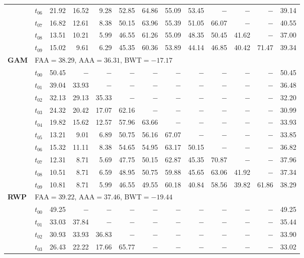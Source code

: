 \begin{table}[ht]
\begin{tabular}{@{}l l r r r r r r r r r r r@{}}
 & $t_{06}$ & 21.92 & 16.52 & 9.28 & 52.85 & 64.86 & 55.09 & 53.45 & $-$ & $-$ & $-$ & 39.14 \\
 & $t_{07}$ & 16.82 & 12.61 & 8.38 & 50.15 & 63.96 & 55.39 & 51.05 & 66.07 & $-$ & $-$ & 40.55 \\
 & $t_{08}$ & 13.51 & 10.21 & 5.99 & 46.55 & 61.26 & 55.09 & 48.35 & 50.45 & 41.62 & $-$ & 37.00 \\
 & $t_{09}$ & 15.02 & 9.61 & 6.29 & 45.35 & 60.36 & 53.89 & 44.14 & 46.85 & 40.42 & 71.47 & 39.34 \\
\midrule
\multirow{11}{*}{\textbf{GAM}} & \multicolumn{12}{l}{\quad\small FAA$=38.29$,\; AAA$=36.31$,\; BWT$=-17.17$} \\
 & $t_{00}$ & 50.45 & $-$ & $-$ & $-$ & $-$ & $-$ & $-$ & $-$ & $-$ & $-$ & 50.45 \\
 & $t_{01}$ & 39.04 & 33.93 & $-$ & $-$ & $-$ & $-$ & $-$ & $-$ & $-$ & $-$ & 36.48 \\
 & $t_{02}$ & 32.13 & 29.13 & 35.33 & $-$ & $-$ & $-$ & $-$ & $-$ & $-$ & $-$ & 32.20 \\
 & $t_{03}$ & 24.32 & 20.42 & 17.07 & 62.16 & $-$ & $-$ & $-$ & $-$ & $-$ & $-$ & 30.99 \\
 & $t_{04}$ & 19.82 & 15.62 & 12.57 & 57.96 & 63.66 & $-$ & $-$ & $-$ & $-$ & $-$ & 33.93 \\
 & $t_{05}$ & 13.21 & 9.01 & 6.89 & 50.75 & 56.16 & 67.07 & $-$ & $-$ & $-$ & $-$ & 33.85 \\
 & $t_{06}$ & 15.32 & 11.11 & 8.38 & 54.65 & 54.95 & 63.17 & 50.15 & $-$ & $-$ & $-$ & 36.82 \\
 & $t_{07}$ & 12.31 & 8.71 & 5.69 & 47.75 & 50.15 & 62.87 & 45.35 & 70.87 & $-$ & $-$ & 37.96 \\
 & $t_{08}$ & 10.51 & 8.71 & 6.59 & 48.95 & 50.75 & 59.88 & 45.65 & 63.06 & 41.92 & $-$ & 37.34 \\
 & $t_{09}$ & 10.81 & 8.71 & 5.99 & 46.55 & 49.55 & 60.18 & 40.84 & 58.56 & 39.82 & 61.86 & 38.29 \\
\midrule
\multirow{11}{*}{\textbf{RWP}} & \multicolumn{12}{l}{\quad\small FAA$=39.22$,\; AAA$=37.46$,\; BWT$=-19.44$} \\
 & $t_{00}$ & 49.25 & $-$ & $-$ & $-$ & $-$ & $-$ & $-$ & $-$ & $-$ & $-$ & 49.25 \\
 & $t_{01}$ & 33.03 & 37.84 & $-$ & $-$ & $-$ & $-$ & $-$ & $-$ & $-$ & $-$ & 35.44 \\
 & $t_{02}$ & 30.93 & 33.93 & 36.83 & $-$ & $-$ & $-$ & $-$ & $-$ & $-$ & $-$ & 33.90 \\
 & $t_{03}$ & 26.43 & 22.22 & 17.66 & 65.77 & $-$ & $-$ & $-$ & $-$ & $-$ & $-$ & 33.02 \\

\end{tabular}
\end{table}
